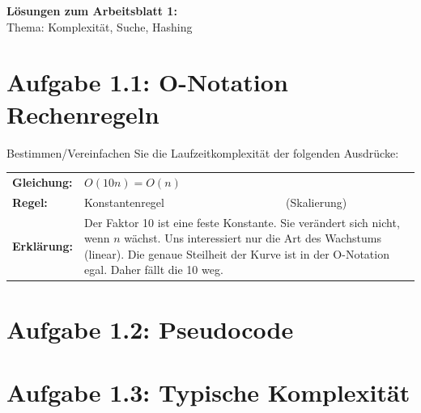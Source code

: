 \documentclass[a4paper,12pt]{article}
\begin{document}
	
	\begin{center}
		\LARGE{\textbf{Lösungen zum Arbeitsblatt 1:}} \\[0.2cm]
		\large{Thema: Komplexität, Suche, Hashing}
	\end{center}
	\vspace{0.5cm}
	
	\section*{Aufgabe 1.1: O-Notation Rechenregeln}
	Bestimmen/Vereinfachen Sie die Laufzeitkomplexität der folgenden Ausdrücke:
	
	\noindent
	\begin{tabular}{llp{9cm}}
		\textbf{Gleichung:} & $O(10n) = O(n)$ & \\
		\textbf{Regel:}     & Konstantenregel & (Skalierung) \\
		\textbf{Erklärung:} & \multicolumn{2}{p{11cm}}{Der Faktor 10 ist eine feste Konstante. Sie verändert sich nicht, wenn $n$ wächst. Uns interessiert nur die Art des Wachstums (linear). Die genaue Steilheit der Kurve ist in der O-Notation egal. Daher fällt die 10 weg.}
	\end{tabular}
	
	
	\section*{Aufgabe 1.2: Pseudocode}
	
	
	
	\section*{Aufgabe 1.3: Typische Komplexität}
	
	
\end{document}
